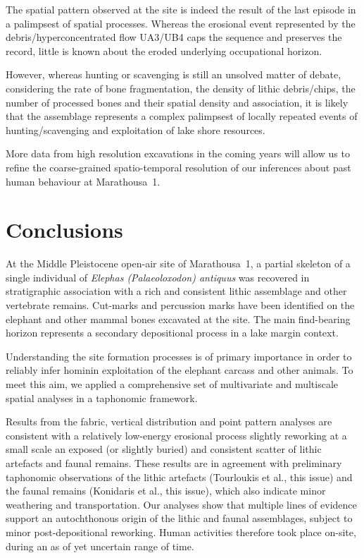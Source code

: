 \documentclass[review,authoryear,times]{elsarticle} %
\begin{document}
The spatial pattern observed at the site is indeed the result of the last episode in a palimpsest of spatial processes. Whereas the erosional event represented by the debris/hyperconcentrated flow UA3/UB4 caps the sequence and preserves the record, little is known about the eroded underlying occupational horizon.

However, whereas hunting or scavenging is still an unsolved matter of debate, considering the rate of bone fragmentation, the density of lithic debris/chips, the number of processed bones and their spatial density and association, it is likely that the assemblage represents a complex palimpsest of locally repeated events of hunting/scavenging and exploitation of lake shore resources. %

More data from high resolution excavations in the coming years will allow us to refine the coarse-grained spatio-temporal resolution of our inferences about past human behaviour at Marathousa~1.

\section{Conclusions}

At the Middle Pleistocene open-air site of Marathousa~1, a partial skeleton of a single individual of \emph{Elephas (Palaeoloxodon) antiquus} was recovered in stratigraphic association with a rich and consistent lithic assemblage and other vertebrate remains. Cut-marks and percussion marks have been identified on the elephant and other mammal bones excavated at the site. The main find-bearing horizon represents a secondary depositional process in a lake margin context.

Understanding the site formation processes is of primary importance in order to reliably infer hominin exploitation of the elephant carcass and other animals. To meet this aim, we applied a comprehensive set of multivariate and multiscale spatial analyses in a taphonomic framework.

Results from the fabric, vertical distribution and point pattern analyses are consistent with a relatively low-energy erosional process slightly reworking at a small scale an exposed (or slightly buried) and consistent scatter of lithic artefacts and faunal remains. These results are in agreement with preliminary taphonomic observations of the lithic artefacts (Tourloukis et al., this issue) and the faunal remains (Konidaris et al., this issue), which also indicate minor weathering and transportation. Our analyses show that multiple lines of evidence support an autochthonous origin of the lithic and faunal assemblages, subject to minor post-depositional reworking. Human activities therefore took place on-site, during an as of yet uncertain range of time.
\end{document}
